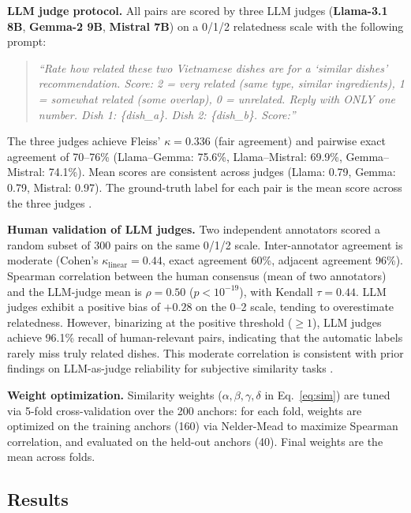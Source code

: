 \textbf{LLM judge protocol.}
All pairs are scored by three LLM judges (\textbf{Llama-3.1 8B}, \textbf{Gemma-2 9B}, \textbf{Mistral 7B}) on a 0/1/2 relatedness scale with the following prompt:

\begin{quote}
\small
\textit{``Rate how related these two Vietnamese dishes are for a `similar dishes' recommendation. Score: 2 = very related (same type, similar ingredients), 1 = somewhat related (some overlap), 0 = unrelated. Reply with ONLY one number. Dish 1: \{dish\_a\}. Dish 2: \{dish\_b\}. Score:''}
\end{quote}

The three judges achieve Fleiss' $\kappa = 0.336$ (fair agreement) and pairwise exact agreement of 70--76\% (Llama--Gemma: 75.6\%, Llama--Mistral: 69.9\%, Gemma--Mistral: 74.1\%). Mean scores are consistent across judges (Llama: 0.79, Gemma: 0.79, Mistral: 0.97). The ground-truth label for each pair is the mean score across the three judges \cite{zheng2023judge, chen2024judgebias, huang2025llmjudge}.

\textbf{Human validation of LLM judges.}
Two independent annotators scored a random subset of 300 pairs on the same 0/1/2 scale. Inter-annotator agreement is moderate (Cohen's $\kappa_{\text{linear}} = 0.44$, exact agreement 60\%, adjacent agreement 96\%). Spearman correlation between the human consensus (mean of two annotators) and the LLM-judge mean is $\rho = 0.50$ ($p < 10^{-19}$), with Kendall $\tau = 0.44$. LLM judges exhibit a positive bias of $+0.28$ on the 0--2 scale, tending to overestimate relatedness. However, binarizing at the positive threshold ($\geq 1$), LLM judges achieve 96.1\% recall of human-relevant pairs, indicating that the automatic labels rarely miss truly related dishes. This moderate correlation is consistent with prior findings on LLM-as-judge reliability for subjective similarity tasks \cite{zheng2023judge}.

\textbf{Weight optimization.}
Similarity weights ($\alpha, \beta, \gamma, \delta$ in Eq.~\ref{eq:sim}) are tuned via 5-fold cross-validation over the 200 anchors: for each fold, weights are optimized on the training anchors (160) via Nelder-Mead to maximize Spearman correlation, and evaluated on the held-out anchors (40). Final weights are the mean across folds.

\subsection{Results}

